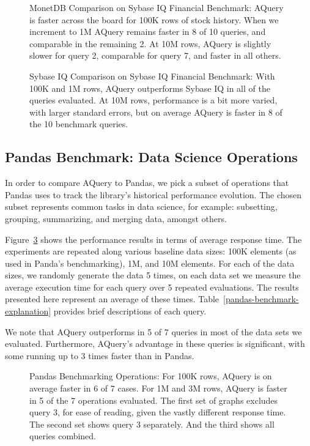 \documentclass{acm_proc_article-sp}
\begin{document}
\begin{figure}
\caption{MonetDB Comparison on Sybase IQ Financial Benchmark: AQuery is faster across the board
for 100K rows of stock history. When we increment to 1M AQuery remains faster in 8 of 10 queries, and comparable
in the remaining 2. At 10M rows, AQuery is slightly slower for query 2, comparable for query 7, and faster in all others.}
\label{fintime-monetdb-benchmark}
\end{figure}

\begin{figure}
\caption{Sybase IQ Comparison on Sybase IQ Financial Benchmark: With 100K and 1M rows, AQuery
outperforms Sybase IQ in all of the queries evaluated. At 10M rows, performance is a bit more varied, with
larger standard errors, but on average AQuery is faster in 8 of the 10 benchmark queries.}
\label{fintime-sybase-benchmark}
\end{figure}


\subsection{Pandas Benchmark: Data Science Operations}
In order to compare AQuery to Pandas, we pick a subset of operations that Pandas uses to track the library's
historical performance evolution\cite{pandas-vbench}. The chosen subset represents common tasks in data science, for example: subsetting, grouping, summarizing, and merging data, amongst others.

Figure~\ref{pandas-benchmark} shows the performance results in terms of average response time. The experiments are repeated along various baseline data sizes: 100K elements (as used in Panda's benchmarking),
1M, and 10M elements. For each of the data sizes, we randomly generate the data 5 times, on each data
set we measure the average execution time for each query over 5 repeated evaluations. The results presented here represent an average of these times. Table~\ref{pandas-benchmark-explanation} provides brief descriptions of each query. 

We note that AQuery outperforms in 5 of 7 queries in most of the data sets we evaluated. Furthermore, AQuery's advantage in these queries is significant, with some running up to 3 times faster than in Pandas.


\begin{figure}
\caption{Pandas Benchmarking Operations: For 100K rows, AQuery is on average faster in 6 of 7 cases. For 1M and 3M rows, AQuery is faster in 5 of the 7 operations evaluated. The first set of graphs excludes query 3, 
for ease of reading, given the vastly different response time. The second set shows query 3 separately. And the third shows all queries combined.}
\label{pandas-benchmark}
\end{figure}
\end{document}
